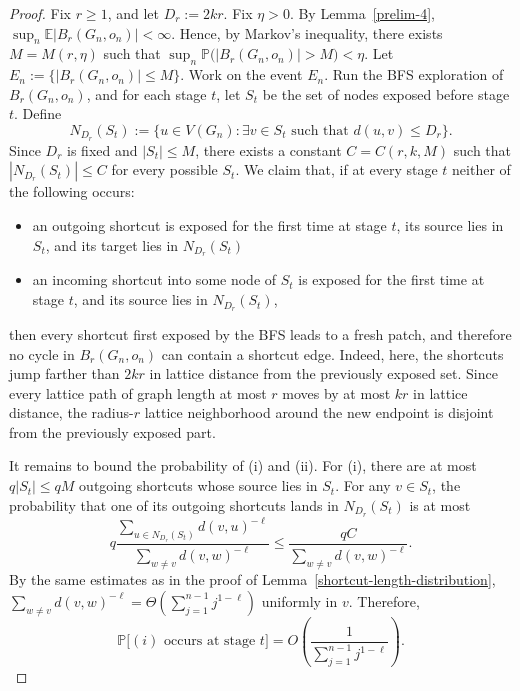 \documentclass[10pt]{amsart}
\begin{document}
\begin{proof}
Fix $r\ge 1$, and let $D_r:=2kr$. Fix $\eta>0$. By Lemma~\ref{prelim-4},
\(
\sup_n \mathbb E|B_r(G_n,o_n)|<\infty.
\)
Hence, by Markov's inequality, there exists $M=M(r,\eta)$ such that
\(
\sup_n \mathbb P\bigl(|B_r(G_n,o_n)|>M\bigr)<\eta.
\)
Let
\(
E_n:=\{|B_r(G_n,o_n)|\le M\}.
\)
Work on the event $E_n$. Run the BFS exploration of $B_r(G_n,o_n)$, and for each stage $t$, let $S_t$ be the set of nodes exposed before stage $t$. Define
\[
N_{D_r}(S_t):=\{u\in V(G_n): \exists v\in S_t \text{ such that } d(u,v)\le D_r\}.
\]
Since $D_r$ is fixed and $|S_t|\le M$, there exists a constant $C=C(r,k,M)$ such that
\(
|N_{D_r}(S_t)|\le C
\)
for every possible $S_t$.
We claim that, if at every stage $t$ neither of the following occurs:
\begin{itemize}
    \item[(i)] an outgoing shortcut is exposed for the first time at stage $t$, its source lies in $S_t$, and its target lies in $N_{D_r}(S_t)$
    \item[(ii)] an incoming shortcut into some node of $S_t$ is exposed for the first time at stage $t$, and its source lies in $N_{D_r}(S_t)$,
\end{itemize}
then every shortcut first exposed by the BFS leads to a fresh patch, and therefore no cycle in $B_r(G_n,o_n)$ can contain a shortcut edge. Indeed, here, the shortcuts jump farther than $2kr$ in lattice distance from the previously exposed set. Since every lattice path of graph length at most $r$ moves by at most $kr$ in lattice distance, the radius-$r$ lattice neighborhood around the new endpoint is disjoint from the previously exposed part.  

It remains to bound the probability of (i) and (ii). For (i), there are at most $q|S_t|\le qM$ outgoing shortcuts whose source lies in $S_t$. For any $v\in S_t$, the probability that one of its outgoing shortcuts lands in $N_{D_r}(S_t)$ is at most
\[
q
\frac{\sum_{u\in N_{D_r}(S_t)} d(v,u)^{-\ell}}
{\sum_{w\neq v} d(v,w)^{-\ell}}
\le
\frac{qC}{\sum_{w\neq v} d(v,w)^{-\ell}}.
\]
By the same estimates as in the proof of Lemma~\ref{shortcut-length-distribution},
\(
\sum_{w\neq v} d(v,w)^{-\ell}
=
\Theta\!\left(\sum_{j=1}^{n-1} j^{1-\ell}\right)
\)
uniformly in $v$. Therefore,
\[
\mathbb P\bigl[(i)\text{ occurs at stage }t\bigr]
=
O\!\left(\frac{1}{\sum_{j=1}^{n-1} j^{1-\ell}}\right).
\]


\end{proof}
\end{document}
